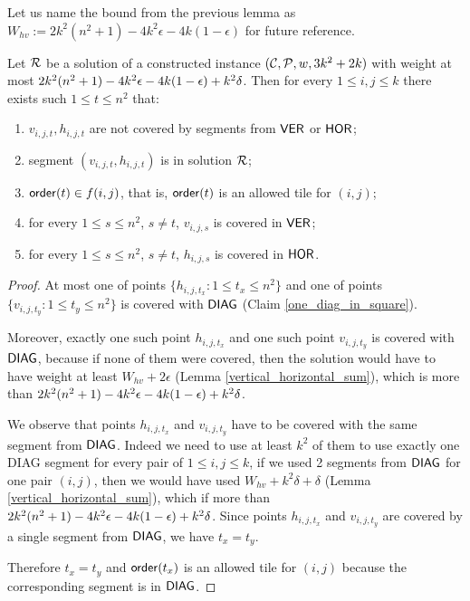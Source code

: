 {{{{Let us name the bound from the previous lemma
as $W_{hv} := 2k^2(n^2+1) -4k^2\epsilon -4k(1-\epsilon)$
for future reference.

\begin{lemma}
\label{diag_correct}
Let $\mathcal{R}$ be a solution 
of a constructed instance $(\mathcal{C}, \mathcal{P}, w, 3k^2+2k)$
with weight at most  $2k^2(n^2+1) - 4k^2\epsilon -4k(1-\epsilon) +k^2\delta$.
Then for every $1 \le i,j \le k$
there exists such $1 \le t \le n^2$ that:
\begin{enumerate}[label={(\arabic*)}]
\item $v_{i,j,t}, h_{i,j,t}$ are not covered by segments from $\mathsf{VER}$ or $\mathsf{HOR}$;
\item segment $(v_{i,j,t}, h_{i,j,t})$ is in solution $\mathcal{R}$;
\item $\mathsf{order}(t) \in f(i,j)$, that is, $\mathsf{order}(t)$ is an allowed tile for $(i,j)$;
\item for every $1 \le s\le n^2$, $s \neq t$, $v_{i,j,s}$ is covered in $\mathsf{VER}$;
\item for every $1 \le s\le n^2$, $s \neq t$, $h_{i,j,s}$ is covered in $\mathsf{HOR}$.
\end{enumerate}
\end{lemma}

\begin{proof}
At most one of points $\{h_{i,j,t_x} : 1 \le t_x \le n^2\}$
and one of points $\{v_{i,j,t_y} : 1 \le t_y \le n^2\}$
is covered with $\mathsf{DIAG}$
(Claim \ref{one_diag_in_square}).
	
Moreover, exactly one such point $h_{i,j,t_x}$ and one such point $v_{i,j,t_y}$
is covered with $\mathsf{DIAG}$,
because if none of them were covered, then the solution would have to
have weight at least $W_{hv} + 2\epsilon$ (Lemma \ref{vertical_horizontal_sum}),
which is more than $2k^2(n^2+1) - 4k^2\epsilon -4k(1-\epsilon) +k^2\delta$.

We observe that points $h_{i,j,t_x}$ and $v_{i,j,t_y}$
have to be covered with the same segment from $\mathsf{DIAG}$.
Indeed we need to use at least $k^2$ of them to use
exactly one DIAG segment for every pair of $1 \le i,j \le k$,
if we used 2 segments from $\mathsf{DIAG}$
for one pair $(i,j)$,
then we would have used $W_{hv} + k^2\delta + \delta$ (Lemma \ref{vertical_horizontal_sum}),
which if more than $2k^2(n^2+1) - 4k^2\epsilon -4k(1-\epsilon) +k^2\delta$.
Since points $h_{i,j,t_x}$ and $v_{i,j,t_y}$ are covered by
a single segment from $\mathsf{DIAG}$, we have $t_x = t_y$.

Therefore $t_x = t_y$
and $\mathsf{order}(t_x)$ is an allowed tile for $(i,j)$
because the corresponding segment is in $\mathsf{DIAG}$.
\end{proof}

}}}}

